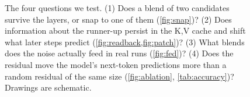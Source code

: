 \begin{figure}[t]
\centering

\caption{The four questions we test.
(1) Does a blend of two candidates survive the layers, or snap to one of them (\cref{fig:snap})?
(2) Does information about the runner-up persist in the K,V cache and shift what later steps predict (\cref{fig:readback,fig:patch})?
(3) What blends does the noise actually feed in real runs (\cref{fig:fed})?
(4) Does the residual move the model's next-token predictions more than a random residual of the same size
(\cref{fig:ablation}, \cref{tab:accuracy})?
Drawings are schematic.}
\label{fig:questions}
\end{figure}
